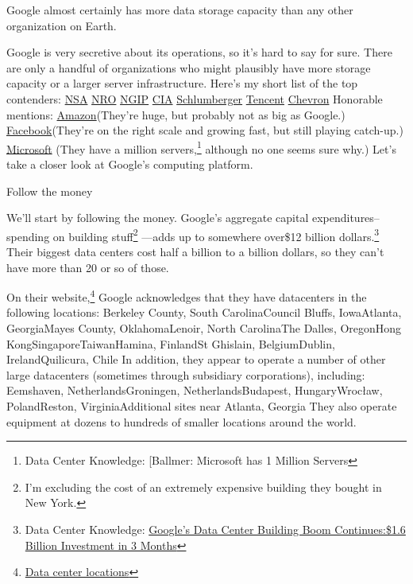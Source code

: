 {{Google almost certainly has more data storage capacity than any other organization on Earth.}

{Google is very secretive about its operations, so it's hard to say for sure. There are only a handful of organizations who might plausibly have more storage capacity or a larger server infrastructure. Here's my short list of the top contenders:}
\href{http://www.nsa.gov/}{NSA} \href{http://www.nro.gov/}{NRO} \href{https://www1.nga.mil/Pages/default.aspx}{NGIP} \href{https://www.cia.gov/index.html}{CIA} \href{http://www.slb.com/}{Schlumberger} \href{http://www.tencent.com/en-us/index.shtml}{Tencent} \href{http://www.chevron.com/} {Chevron}
{Honorable mentions:}
\href{https://en.wikipedia.org/wiki/Amazon\_River}{Amazon}(They're huge, but probably not as big as Google.) \href{https://en.wikipedia.org/wiki/Face\_book}{Facebook}(They're on the right scale and growing fast, but still playing catch-up.) \href{https://en.wikipedia.org/wiki/Microsoft\_Bob}{Microsoft} (They have a million servers,{\footnote{Data Center Knowledge: [Ballmer: Microsoft has 1 Million Servers} } although no one seems sure why.)
{Let's take a closer look at Google's computing platform.}

{Follow the money}

{We'll start by following the money. Google's aggregate capital expenditures–spending on building stuff{\footnote{I'm excluding the cost of an extremely expensive building they bought in New York.} } —adds up to somewhere over\$12 billion dollars.{\footnote{Data Center Knowledge: \href{http://www.datacenterknowledge.com/archives/2013/07/19/google-data-center-spending-continues-to-soar-1-6-billion-in-3-months/}{Google’s Data Center Building Boom Continues:\$1.6 Billion Investment in 3 Months}} } Their biggest data centers cost half a billion to a billion dollars, so they can't have more than 20 or so of those.}

{On their website,{\footnote{ \href{http://www.google.com/about/datacenters/inside/locations/index.html}{Data center locations}} } Google acknowledges that they have datacenters in the following locations:}
Berkeley County, South CarolinaCouncil Bluffs, IowaAtlanta, GeorgiaMayes County, OklahomaLenoir, North CarolinaThe Dalles, OregonHong KongSingaporeTaiwanHamina, FinlandSt Ghislain, BelgiumDublin, IrelandQuilicura, Chile
{In addition, they appear to operate a number of other large datacenters (sometimes through subsidiary corporations), including:}
Eemshaven, NetherlandsGroningen, NetherlandsBudapest, HungaryWrocław, PolandReston, VirginiaAdditional sites near Atlanta, Georgia
{They also operate equipment at dozens to hundreds of smaller locations around the world.}

}
